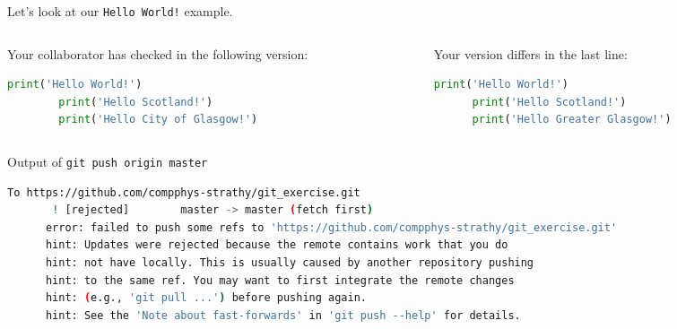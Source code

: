 \begin{frame}[fragile]
\emptyframetitle

  Let's look at our \texttt{Hello World!} example.\\[0.cm]

  \begin{columns}
    \begin{column}{0.5\textwidth}

      Your collaborator has checked in the following version:

      \begin{lstlisting}[language=python,basicstyle=\small\ttfamily]
        print('Hello World!')
        print('Hello Scotland!')
        print('Hello City of Glasgow!')
      \end{lstlisting}

    \end{column}

  \begin{column}{0.5\textwidth}

    Your version differs in the last line:
    \vspace{0.25cm}\\
    \begin{lstlisting}[language=python,basicstyle=\small\ttfamily]
      print('Hello World!')
      print('Hello Scotland!')
      print('Hello Greater Glasgow!')
    \end{lstlisting}

    \end{column}
  \end{columns}

  \begin{block}{Output of \texttt{git push origin master}}
    \begin{lstlisting}[language=bash, basicstyle=\tiny\ttfamily]
      To https://github.com/compphys-strathy/git_exercise.git
       ! [rejected]        master -> master (fetch first)
      error: failed to push some refs to 'https://github.com/compphys-strathy/git_exercise.git'
      hint: Updates were rejected because the remote contains work that you do
      hint: not have locally. This is usually caused by another repository pushing
      hint: to the same ref. You may want to first integrate the remote changes
      hint: (e.g., 'git pull ...') before pushing again.
      hint: See the 'Note about fast-forwards' in 'git push --help' for details.
    \end{lstlisting}
  \end{block}


\end{frame}

